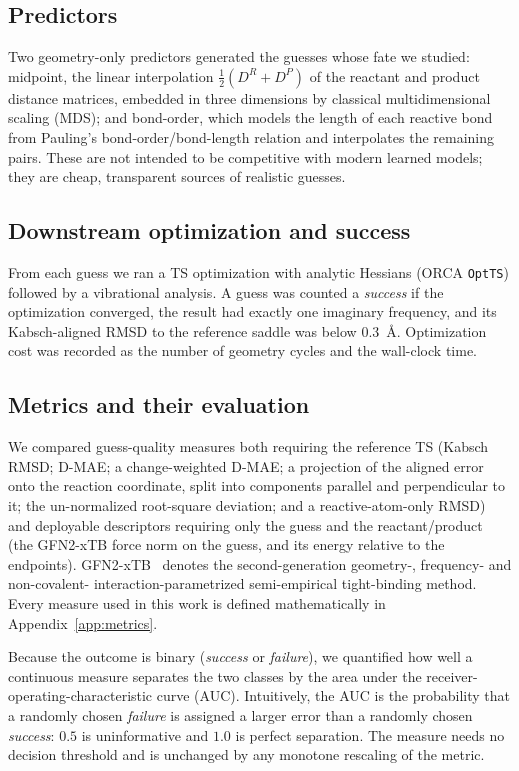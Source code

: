 \documentclass[11pt]{article}
\begin{document}
\subsection{Predictors}
\label{sec:guesses}
Two geometry-only predictors generated the guesses whose fate we studied:
midpoint, the linear interpolation $\tfrac{1}{2}(D^{R}+D^{P})$ of the
reactant and product distance matrices, embedded in three dimensions by classical
multidimensional scaling (MDS); and bond-order, which models the length of
each reactive bond from Pauling's bond-order/bond-length relation and interpolates
the remaining pairs. These are not intended to be competitive with modern
learned models; they are cheap, transparent sources of realistic guesses.

\subsection{Downstream optimization and success}
From each guess we ran a TS optimization with analytic Hessians
(ORCA \texttt{OptTS}) followed by a vibrational analysis. A guess was counted a
\textit{success} if the optimization converged, the result had exactly one
imaginary frequency, and its Kabsch-aligned RMSD to the reference saddle was below
$0.3$~\AA. Optimization cost was recorded as the number of geometry cycles and the
wall-clock time.

\subsection{Metrics and their evaluation}
\label{sec:metrics}
We compared guess-quality measures both requiring the reference TS (Kabsch RMSD;
D-MAE; a change-weighted D-MAE; a projection of the aligned error onto the
reaction coordinate, split into components parallel and perpendicular to it; the
un-normalized root-square deviation; and a reactive-atom-only RMSD) and
deployable descriptors requiring only the guess and the reactant/product
(the GFN2-xTB force norm on the guess, and its energy relative to the endpoints).
GFN2-xTB~\cite{Bannwarth2019} denotes the second-generation geometry-, frequency- and non-covalent-
interaction-parametrized semi-empirical tight-binding method. Every measure used in
this work is defined mathematically in Appendix~\ref{app:metrics}.

Because the outcome is binary (\textit{success} or \textit{failure}), we quantified how well a
continuous measure separates the two classes by the area under the
receiver-operating-characteristic curve (AUC). Intuitively, the AUC is the
probability that a randomly chosen \textit{failure} is assigned a larger error than a
randomly chosen \textit{success}: $0.5$ is uninformative and $1.0$ is
perfect separation. The measure needs no decision threshold and is unchanged by
any monotone rescaling of the metric.
\end{document}
